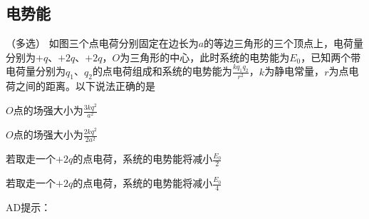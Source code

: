 \subsection{电势能}

\begin{proset}
    （多选）
    如图三个点电荷分别固定在边长为\(a\)的等边三角形的三个顶点上，电荷量分别为\( + q\)、\( + 2q\)、\( + 2q\)，\(O\)为三角形的中心，此时系统的电势能为\(E_0\)，已知两个带电荷量分别为\(q_1\)、\(q_2\)的点电荷组成和系统的电势能为\(\frac{kq_1q_2}{r^2}\)，\(k\)为静电常量，\(r\)为点电荷之间的距离。以下说法正确的是\paren[]

    \begin{choices}
        \item \(O\)点的场强大小为\(\frac{3kq^2}{a^2}\)
        \item \(O\)点的场强大小为\(\frac{2kq^2}{2a^2}\)
        \item 若取走一个\( + 2q\)的点电荷，系统的电势能将减小\(\frac{E_0}{2}\)
        \item 若取走一个\( + 2q\)的点电荷，系统的电势能将减小\(\frac{E_0}{4}\)
    \end{choices}
\end{proset}
\begin{answer}
    AD\quad 提示：
\end{answer}